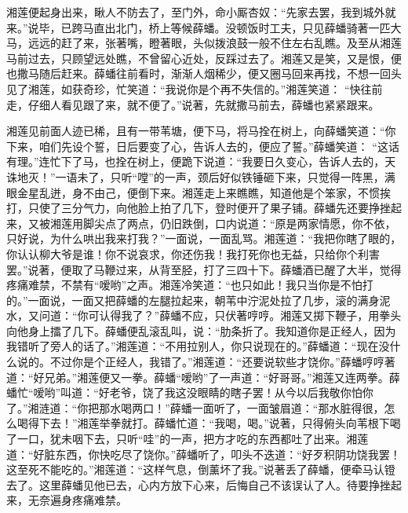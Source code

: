 \begin{parag}
    湘莲便起身出来，瞅人不防去了，至门外，命小厮杏奴：“先家去罢，我到城外就来。”说毕，已跨马直出北门，桥上等候薛蟠。没顿饭时工夫，只见薛蟠骑著一匹大马，远远的赶了来，张著嘴，瞪著眼，头似拨浪鼓一般不住左右乱瞧。及至从湘莲马前过去，只顾望远处瞧，不曾留心近处，反踩过去了。湘莲又是笑，又是恨，便也撒马随后赶来。薛蟠往前看时，渐渐人烟稀少，便又圈马回来再找，不想一回头见了湘莲，如获奇珍，忙笑道：“我说你是个再不失信的。”湘莲笑道： “快往前走，仔细人看见跟了来，就不便了。”说著，先就撒马前去，薛蟠也紧紧跟来。
\end{parag}


\begin{parag}
    湘莲见前面人迹已稀，且有一带苇塘，便下马，将马拴在树上，向薛蟠笑道：“你下来，咱们先设个誓，日后要变了心，告诉人去的，便应了誓。”薛蟠笑道： “这话有理。”连忙下了马，也拴在树上，便跪下说道：“我要日久变心，告诉人去的，天诛地灭！”一语未了，只听“嘡”的一声，颈后好似铁锤砸下来，只觉得一阵黑，满眼金星乱迸，身不由己，便倒下来。湘莲走上来瞧瞧，知道他是个笨家，不惯挨打，只使了三分气力，向他脸上拍了几下，登时便开了果子铺。薛蟠先还要挣挫起来，又被湘莲用脚尖点了两点，仍旧跌倒，口内说道：“原是两家情愿，你不依，只好说，为什么哄出我来打我？”一面说，一面乱骂。湘莲道：“我把你瞎了眼的，你认认柳大爷是谁！你不说哀求，你还伤我！我打死你也无益，只给你个利害罢。”说著，便取了马鞭过来，从背至胫，打了三四十下。薛蟠酒已醒了大半，觉得疼痛难禁，不禁有“嗳哟”之声。湘莲冷笑道：“也只如此！我只当你是不怕打的。”一面说，一面又把薛蟠的左腿拉起来，朝苇中泞泥处拉了几步，滚的满身泥水，又问道：“你可认得我了？”薛蟠不应，只伏著哼哼。湘莲又掷下鞭子，用拳头向他身上擂了几下。薛蟠便乱滚乱叫，说：“肋条折了。我知道你是正经人，因为我错听了旁人的话了。”湘莲道：“不用拉别人，你只说现在的。”薛蟠道：“现在没什么说的。不过你是个正经人，我错了。”湘莲道：“还要说软些才饶你。”薛蟠哼哼著道：“好兄弟。”湘莲便又一拳。薛蟠“嗳哟”了一声道：“好哥哥。”湘莲又连两拳。薛蟠忙“嗳哟”叫道：“好老爷，饶了我这没眼睛的瞎子罢！从今以后我敬你怕你了。”湘涟道：“你把那水喝两口！”薛蟠一面听了，一面皱眉道：“那水脏得很，怎么喝得下去！”湘莲举拳就打。薛蟠忙道：“我喝，喝。”说著，只得俯头向苇根下喝了一口，犹未咽下去，只听“哇”的一声，把方才吃的东西都吐了出来。湘莲道：“好脏东西，你快吃尽了饶你。”薛蟠听了，叩头不迭道：“好歹积阴功饶我罢！这至死不能吃的。”湘莲道：“这样气息，倒薰坏了我。”说著丢了薛蟠，便牵马认镫去了。这里薛蟠见他已去，心内方放下心来，后悔自己不该误认了人。待要挣挫起来，无奈遍身疼痛难禁。
\end{parag}


